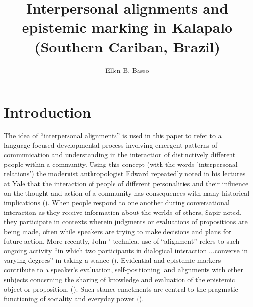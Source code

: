 \documentclass[output=paper]{langsci/langscibook}
\author{Ellen B. Basso \affiliation{University of Arizona}}
\title{Interpersonal alignments and epistemic marking in Kalapalo (Southern Cariban, Brazil)}
\begin{document}
\maketitle

\section{Introduction}\label{s:eb1} 

The idea of “interpersonal alignments” is used in this paper to refer to a language-focused developmental process involving emergent patterns of communication and understanding in the interaction of distinctively different people within a community. Using this concept (with the words 'interpersonal relations') the modernist anthropologist Edward \citeauthor{Sapir1932} repeatedly noted in his lectures at Yale that the interaction of people of different personalities and their influence on the thought and action of a community has consequences with many historical implications (\citealt[204]{Sapir1993}). When people respond to one another during conversational interaction as they receive information about the worlds of others, Sapir noted, they participate in contexts wherein  judgments or evaluations of propositions are being made, often while speakers are trying to make decisions and plans for future action.  More recently,   John \citeauthor{DuBois2004}’ technical use of “alignment” refers to such ongoing activity   ``in which two participants in dialogical interaction ...converse in varying degrees''  in taking a stance (\citeyear[22--23]{DuBois2004}).  Evidential and epistemic markers contribute to a speaker’s evaluation, self-positioning, and alignments with other subjects concerning the sharing of knowledge and evaluation of the epistemic object or proposition. (\citealt[24]{DuBois2007}).  Such stance enactments are central to the pragmatic functioning  of sociality and everyday power (\citealt[5--6]{Ameka2004}).   
\end{document}
